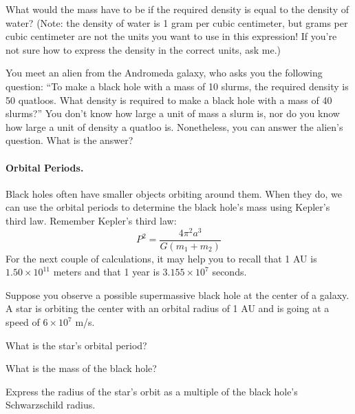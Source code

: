 \answerspace{1in}

What would the mass have to be if the required density is equal to the
density of water?  (Note: the density of water is 1 gram per cubic
centimeter, but grams per cubic centimeter are not the units you 
want to use in this expression!  If you're not sure how to express
the density in the correct units, ask me.)

\answerspace{2in}


You meet an alien from the Andromeda galaxy, who asks you the following
question: ``To make a black hole with a mass of 10 slurms, the required
density is 50 quatloos.  What density is required to make a black
hole with a mass of 40 slurms?''  You don't know how large a unit of 
mass a slurm is, nor do you know how large a unit of density a quatloo is.
Nonetheless, you can answer the alien's question.  What is the answer?

\answerspace{2in}



\paragraph{Orbital Periods.}
Black holes often have smaller objects orbiting around them.  When they do,
we can use the orbital periods to determine the black hole's mass
using Kepler's third law.  Remember Kepler's third law:
$$
P^2=\frac{4\pi^2a^3}{G(m_1+m_2)}
$$
For the next couple of calculations, it may help you to recall that
1 AU is $1.50\times 10^{11}$ meters and that 
1 year is $3.155\times 10^7$ seconds.

Suppose you observe a possible supermassive black hole at the center
of a galaxy.  A star is orbiting the center with an orbital radius of 1 AU
and is going at a speed of $6\times 10^7$ m/s.

What is the star's orbital period?

\answerspace{2in}

What is the mass of the black hole?

\answerspace{2in}

Express the radius of the star's orbit as a multiple of the 
black hole's Schwarzschild radius.  


